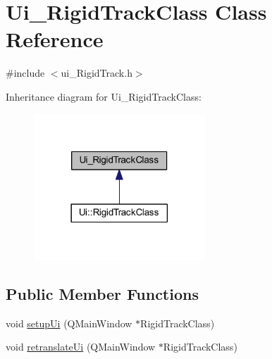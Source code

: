 \hypertarget{class_ui___rigid_track_class}{}\section{Ui\+\_\+\+Rigid\+Track\+Class Class Reference}
\label{class_ui___rigid_track_class}


{\ttfamily \#include $<$ui\+\_\+\+Rigid\+Track.\+h$>$}



Inheritance diagram for Ui\+\_\+\+Rigid\+Track\+Class\+:
\nopagebreak
\begin{figure}[H]
\begin{center}
\leavevmode
\includegraphics[width=182pt]{class_ui___rigid_track_class__inherit__graph}
\end{center}
\end{figure}
\subsection*{Public Member Functions}
\begin{DoxyCompactItemize}
\item 
void \hyperlink{class_ui___rigid_track_class_a7f78fefc15716049b873bef4d3450e38}{setup\+Ui} (Q\+Main\+Window $\ast$Rigid\+Track\+Class)
\item 
void \hyperlink{class_ui___rigid_track_class_a7c96951c4e173848e7695d6bd7883af6}{retranslate\+Ui} (Q\+Main\+Window $\ast$Rigid\+Track\+Class)
\end{DoxyCompactItemize}

